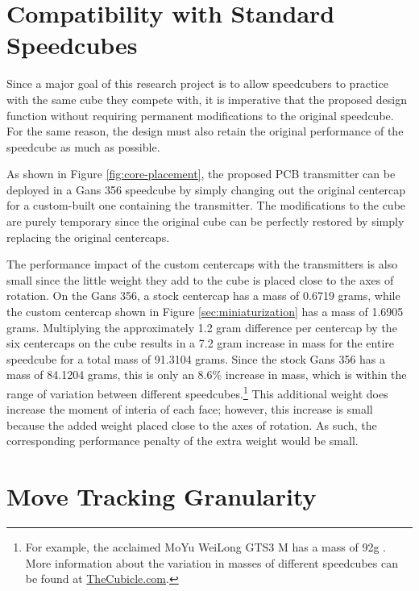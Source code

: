 \section{Compatibility with Standard Speedcubes}
\label{sec:compatibility-with-standard-speedcubes}

Since a major goal of this research project is to allow speedcubers to
practice with the same cube they compete with, it is imperative that
the proposed design function without requiring permanent modifications
to the original speedcube. For the same reason, the design must also
retain the original performance of the speedcube as much as possible.

As shown in Figure \ref{fig:core-placement}, the proposed PCB
transmitter can be deployed in a Gans 356 speedcube by simply changing
out the original centercap for a custom-built one containing the
transmitter. The modifications to the cube are purely temporary since
the original cube can be perfectly restored by simply replacing the
original centercaps.

The performance impact of the custom centercaps with the transmitters
is also small since the little weight they add to the cube is placed
close to the axes of rotation. On the Gans 356, a stock centercap has a
mass of 0.6719 grams, while the custom centercap shown in Figure
\ref{sec:miniaturization} has a mass of 1.6905 grams. Multiplying the
approximately 1.2 gram difference per centercap by the six centercaps
on the cube results in a 7.2 gram increase in mass for the entire
speedcube for a total mass of 91.3104 grams. Since the stock Gans 356
has a mass of 84.1204 grams, this is only an 8.6\% increase in mass,
which is within the range of variation between different
speedcubes.\footnote{For example, the acclaimed MoYu WeiLong GTS3 M has
a mass of 92g \cite{moyu-thecubicle}. More information about the
variation in masses of different speedcubes can be found at
\href{https://www.thecubicle.com/collections/3x3-speed-cubes}{TheCubicle.com}.}
This additional weight does increase the moment of interia of each
face; however, this increase is small because the added weight placed
close to the axes of rotation. As such, the corresponding performance
penalty of the extra weight would be small.


\section{Move Tracking Granularity}
\label{sec:move-tracking-granularity}

